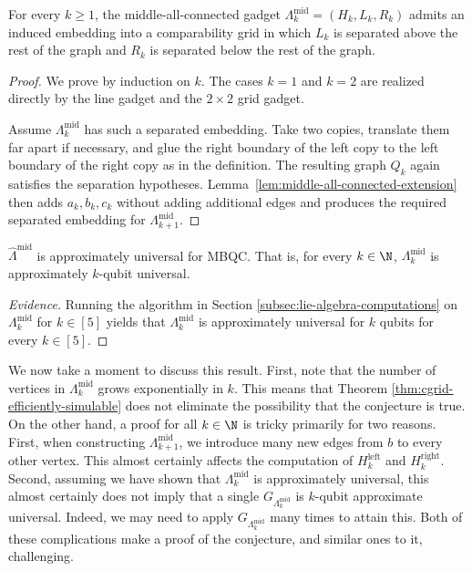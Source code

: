 \begin{theorem}
\label{thm:middle-all-connected-cgrid}
For every \(k\ge 1\), the middle-all-connected gadget
\(\Lambda_k^{\mathrm{mid}}=(H_k,L_k,R_k)\) admits an induced embedding into a
comparability grid in which \(L_k\) is separated above the rest of the graph and
\(R_k\) is separated below the rest of the graph.
\end{theorem}

\begin{proof}
We prove by induction on \(k\).
The cases \(k=1\) and \(k=2\) are realized directly by the line gadget and the
\(2\times2\) grid gadget.

Assume \(\Lambda_k^{\mathrm{mid}}\) has such a separated embedding. Take two
copies, translate them far apart if necessary, and glue the right boundary of
the left copy to the left boundary of the right copy as in the definition. The
resulting graph \(Q_k\) again satisfies the separation hypotheses. Lemma~\ref{lem:middle-all-connected-extension}
then adds \(a_k,b_k,c_k\) without adding additional edges and produces the required
separated embedding for \(\Lambda_{k+1}^{\mathrm{mid}}\).
\end{proof}

\begin{conjecture}
$\hat\Lambda^{\mathrm{mid}}$ is approximately universal for MBQC. That is, for every $k \in \N$, $\Lambda_k^{\mathrm{mid}}$ is approximately $k$-qubit universal.
\end{conjecture}

\begin{proof}[Evidence]
Running the algorithm in Section \ref{subsec:lie-algebra-computations} on $\Lambda_k^{\mathrm{mid}}$ for $k \in [5]$ yields that $\Lambda_k^{\mathrm{mid}}$ is approximately universal for $k$ qubits for every $k \in [5]$.
\end{proof}

We now take a moment to discuss this result. First, note that the number of vertices in $\Lambda_k^{\mathrm{mid}}$ grows exponentially in $k$. This means that Theorem \ref{thm:cgrid-efficiently-simulable} does not eliminate the possibility that the conjecture is true. On the other hand, a proof for all $k \in \N$ is tricky primarily for two reasons. First, when constructing $\Lambda_{k+1}^{\mathrm{mid}}$, we introduce many new edges from $b$ to every other vertex. This almost certainly affects the computation of $H_k^\mathrm{left}$ and $H_k^\mathrm{right}$. Second, assuming we have shown that $\Lambda_{k}^{\mathrm{mid}}$ is approximately universal, this almost certainly does not imply that a single $G_{\Lambda_{k}^{\mathrm{mid}}}$ is $k$-qubit approximate universal. Indeed, we may need to apply $G_{\Lambda_{k}^{\mathrm{mid}}}$  many times to attain this. Both of these complications make a proof of the conjecture, and similar ones to it, challenging.

